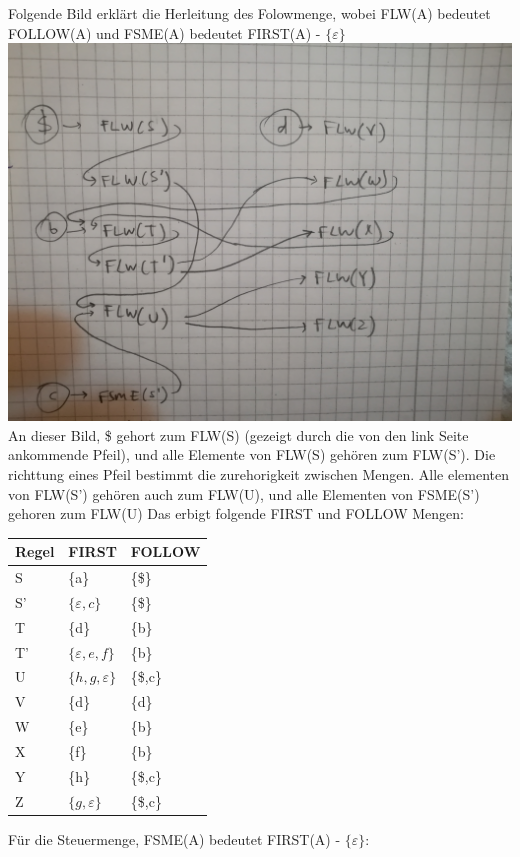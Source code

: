 \documentclass[11pt]{scrartcl}
\begin{document}
		Folgende Bild erklärt die Herleitung des Folowmenge, wobei FLW(A) bedeutet FOLLOW(A) und FSME(A) bedeutet FIRST(A) - $ \{\varepsilon\} $
		\newline
		\newline
		\includegraphics[width=0.7\linewidth]{followset}
		\newline
		An dieser Bild, \$ gehort zum FLW(S) (gezeigt durch die von den link Seite ankommende Pfeil), und alle Elemente von FLW(S) gehören zum FLW(S'). Die richttung eines Pfeil bestimmt die zurehorigkeit zwischen Mengen. Alle elementen von FLW(S') gehören auch zum FLW(U), und alle Elementen von FSME(S') gehoren zum FLW(U) Das erbigt folgende FIRST und FOLLOW Mengen:
		\newline
		\newline
	\begin{tabular}{l|l|l}
		Regel & FIRST & FOLLOW \\ \hline
		S & \{a\} & \{\$\}  \\
		S' & $\{\varepsilon,c\}$ & \{\$\}  \\
		T & \{d\} & \{b\}   \\
		T' & $\{\varepsilon,e,f\}$ & \{b\}   \\
		U & $\{h, g, \varepsilon\}$ & \{\$,c\} \\
		V & \{d\} & \{d\} \\
		W & \{e\} & \{b\} \\
		X & \{f\} & \{b\} \\
		Y & \{h\} & \{\$,c\} \\
		Z & $\{g,\varepsilon\}$ & \{\$,c\} 
	\end{tabular}
	\newline


	Für die Steuermenge, FSME(A) bedeutet FIRST(A) - $ \{\varepsilon\}$:
	
\end{document}
